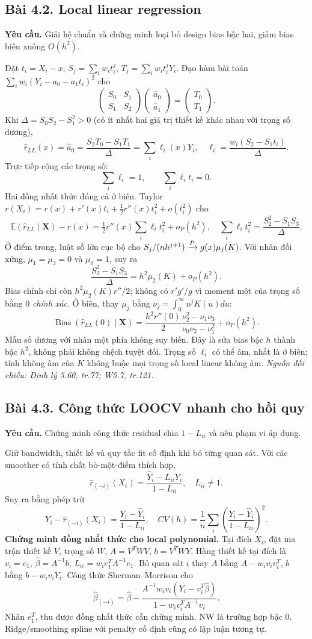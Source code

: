 \documentclass[11pt,a4paper]{article}
\newcommand{\E}{\mathbb E}\newcommand{\Pp}{\mathbb P}
\DeclareMathOperator{\Bias}{Bias}\DeclareMathOperator{\MSE}{MSE}
\newcommand{\src}[1]{\textit{Nguồn đối chiếu: #1.}}
\newcommand{\prob}[3]{\subsection{Bài #1. #2}\label{b:#1}\textbf{Yêu cầu.} #3\par}
\begin{document}
\prob{4.2}{Local linear regression}{Giải hệ chuẩn và chứng minh loại bỏ design bias bậc hai, giảm bias biên xuống $O(h^2)$.}
Đặt $t_i=X_i-x$, $S_j=\sum_iw_it_i^j$, $T_j=\sum_iw_it_i^jY_i$. Đạo hàm bài toán $\sum_iw_i(Y_i-a_0-a_1t_i)^2$ cho
\[
\begin{pmatrix}S_0&S_1\\S_1&S_2\end{pmatrix}
\begin{pmatrix}\widehat a_0\\\widehat a_1\end{pmatrix}
=\begin{pmatrix}T_0\\T_1\end{pmatrix}.
\]
Khi $\Delta=S_0S_2-S_1^2>0$ (có ít nhất hai giá trị thiết kế khác nhau với trọng số dương),
\[
\widehat r_{LL}(x)=\widehat a_0=\frac{S_2T_0-S_1T_1}{\Delta}
=\sum_i\ell_i(x)Y_i,\quad
\ell_i=\frac{w_i(S_2-S_1t_i)}\Delta.
\]
Trực tiếp cộng các trọng số:
\[
\sum_i\ell_i=1,\qquad\sum_i\ell_it_i=0.
\]
Hai đồng nhất thức đúng cả ở biên. Taylor $r(X_i)=r(x)+r'(x)t_i+\frac12r''(x)t_i^2+o(t_i^2)$ cho
\[
\E(\widehat r_{LL}\mid\mathbf X)-r(x)
=\tfrac12r''(x)\sum_i\ell_it_i^2+o_P(h^2),
\quad
\sum_i\ell_it_i^2=\frac{S_2^2-S_1S_3}{\Delta}.
\]
Ở điểm trong, luật số lớn cục bộ cho $S_j/(nh^{j+1})\xrightarrow{P} g(x)\mu_j(K)$.
Với nhân đối xứng, $\mu_1=\mu_3=0$ và $\mu_0=1$, suy ra
\[
\frac{S_2^2-S_1S_3}{\Delta}=h^2\mu_2(K)+o_P(h^2).
\]
Bias chính chỉ còn $h^2\mu_2(K)r''/2$; không có $r'g'/g$ vì moment một của trọng số bằng 0 \emph{chính xác}.
Ở biên, thay $\mu_j$ bằng $\nu_j=\int_0^\infty u^jK(u)du$:
\[
\Bias(\widehat r_{LL}(0)\mid\mathbf X)
=\frac{h^2r''(0)}2\frac{\nu_2^2-\nu_1\nu_3}{\nu_0\nu_2-\nu_1^2}+o_P(h^2).
\]
Mẫu số dương với nhân một phía không suy biến. Đây là sửa bias bậc $h$ thành bậc $h^2$, không phải không chệch tuyệt đối. Trọng số $\ell_i$ có thể âm, nhất là ở biên; tính không âm của $K$ không buộc mọi trọng số local linear không âm.
\src{Định lý 5.60, tr.77; W5.7, tr.121}

\prob{4.3}{Công thức LOOCV nhanh cho hồi quy}{Chứng minh công thức residual chia $1-L_{ii}$ và nêu phạm vi áp dụng.}
Giữ bandwidth, thiết kế và quy tắc fit cố định khi bỏ từng quan sát. Với các smoother có tính chất bỏ-một-điểm thích hợp,
\[
\widehat r_{(-i)}(X_i)=\frac{\widehat Y_i-L_{ii}Y_i}{1-L_{ii}},\quad L_{ii}\ne1.
\]
Suy ra bằng phép trừ
\[
Y_i-\widehat r_{(-i)}(X_i)=\frac{Y_i-\widehat Y_i}{1-L_{ii}},\quad
CV(h)=\frac1n\sum_i\left(\frac{Y_i-\widehat Y_i}{1-L_{ii}}\right)^2.
\]
\textbf{Chứng minh đồng nhất thức cho local polynomial.} Tại đích $X_i$, đặt ma trận thiết kế $V$, trọng số $W$, $A=V^TWV$, $b=V^TWY$. Hàng thiết kế tại đích là $v_i=e_1$, $\widehat\beta=A^{-1}b$, $L_{ii}=w_i e_1^TA^{-1}e_1$. Bỏ quan sát $i$ thay $A$ bằng $A-w_iv_iv_i^T$, $b$ bằng $b-w_iv_iY_i$. Công thức Sherman--Morrison cho
\[
\widehat\beta_{(-i)}=\widehat\beta-
\frac{A^{-1}w_iv_i(Y_i-v_i^T\widehat\beta)}{1-w_iv_i^TA^{-1}v_i}.
\]
Nhân $e_1^T$, thu được đồng nhất thức cần chứng minh. NW là trường hợp bậc 0. Ridge/smoothing spline với penalty cố định cũng có lập luận tương tự.
\end{document}
